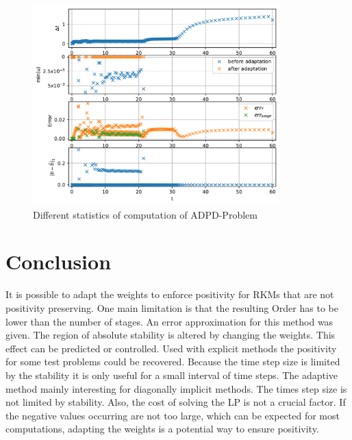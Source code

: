 \documentclass[a4paper]{article}
\numberwithin{equation}{section}
\theoremstyle{plain}
\theoremstyle{definition}
\numberwithin{theorem}{section}
\newcommand{\1}{\mathbbm{1}}
\begin{document}
\begin{figure}
\centering
\includegraphics[width=0.85\textwidth]{plots/ADP_stepsize,b.pdf}
\caption{Different statistics of computation of ADPD-Problem}
\label{fig:Stats_ADP}
\end{figure}


\section{Conclusion} \label{sec:conclusion}
It is possible to adapt the weights to enforce positivity for RKMs that are not positivity preserving. 
One main limitation is that the resulting Order has to be lower than the number of stages.  
An error approximation for this method was given.  
The region of absolute stability is altered by changing the weights. This effect can be predicted or controlled. 
Used with explicit methods the positivity for some test problems could be recovered.  
Because the time step size is limited by the stability it is only useful for a small interval of time steps. 
The adaptive method mainly interesting for diagonally implicit methods.  
The times step size is not limited by stability. 
Also, the cost of solving the LP is not a crucial factor.  
If the negative values occurring are not too large, which can be expected for most computations, adapting the weights is a potential way to ensure positivity. 






\end{document}
